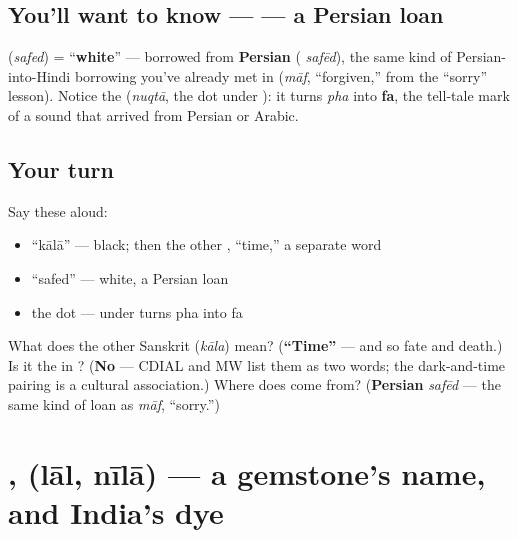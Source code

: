 \subsection*{You'll want to know —  — a Persian loan}
\textbf{} (\emph{safed}) = \textquotedblleft{}\textbf{white}\textquotedblright{} — borrowed from \textbf{Persian} ( \emph{safēd}), the same kind of Persian-into-Hindi borrowing you've already met in \textbf{} (\emph{māf}, \textquotedblleft{}forgiven,\textquotedblright{} from the \textquotedblleft{}sorry\textquotedblright{} lesson). Notice the \textbf{} (\emph{nuqtā}, the dot under ): it turns \emph{pha} into \textbf{fa}, the tell-tale mark of a sound that arrived from Persian or Arabic.

\subsection*{Your turn}
Say these aloud:

\begin{itemize}
\raggedright
  \item \textquotedblleft{}kālā\textquotedblright{} — black; then the other , \textquotedblleft{}time,\textquotedblright{} a separate word
  \item \textquotedblleft{}safed\textquotedblright{} — white, a Persian loan
  \item the dot —  under  turns pha into fa
\end{itemize}

\begin{tcolorbox}[breakable,colback=teal!4,colframe=teal!35!black,title={Before you move on}]
What does the other Sanskrit \textbf{} (\emph{kāla}) mean? (\textbf{\textquotedblleft{}Time\textquotedblright{}} — and so fate and death.) Is it the  in \textbf{}? (\textbf{No} — CDIAL and MW list them as two words; the dark-and-time pairing is a cultural association.) Where does \textbf{} come from? (\textbf{Persian} \emph{safēd} — the same kind of loan as \emph{māf}, \textquotedblleft{}sorry.\textquotedblright{})
\end{tcolorbox}
\section[\texorpdfstring{\hi{लाल} \hi{नीला} (lāl nīlā)}{लाल नीला (lāl nīlā)}]{,  (lāl, nīlā) — a gemstone's name, and India's dye}


